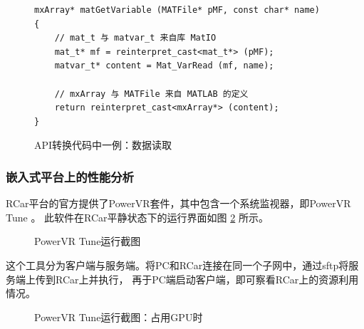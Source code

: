 \begin{figure}[!hbt]
\centering
\begin{lstlisting}
mxArray* matGetVariable (MATFile* pMF, const char* name)
{
    // mat_t 与 matvar_t 来自库 MatIO
    mat_t* mf = reinterpret_cast<mat_t*> (pMF);
    matvar_t* content = Mat_VarRead (mf, name);

    // mxArray 与 MATFile 来自 MATLAB 的定义
    return reinterpret_cast<mxArray*> (content);
}
\end{lstlisting}
\caption{API转换代码中一例：数据读取} \label{fig:fake}
\end{figure}


\subsubsection{嵌入式平台上的性能分析}
RCar平台的官方提供了PowerVR套件，其中包含一个系统监视器，即PowerVR Tune \cite{pvrsdk}。
此软件在RCar平静状态下的运行界面如图 \ref{fig:pvrtune} 所示。

\newsavebox{\pvrtune}
\begin{figure}[!hbt]
\centering
\usebox{\pvrtune}
\caption{PowerVR Tune运行截图} \label{fig:pvrtune}
\end{figure}

这个工具分为客户端与服务端。将PC和RCar连接在同一个子网中，通过sftp将服务端上传到RCar上并执行，
再于PC端启动客户端，即可察看RCar上的资源利用情况。

\newsavebox{\pvrtunegpu}
\begin{figure}[!hbt]
\centering
\usebox{\pvrtunegpu}
\caption{PowerVR Tune运行截图：占用GPU时} \label{fig:pvrtunegpu}
\end{figure}

